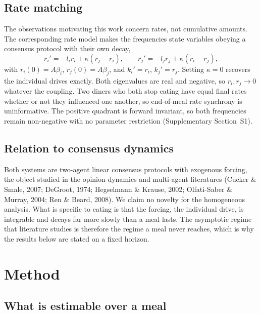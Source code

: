\documentclass[12pt]{article}
\newcommand{\ki}{k_i}
\newcommand{\kj}{k_j}
\begin{document}
\subsection*{Rate matching}

The observations motivating this work concern rates, not cumulative amounts. The
corresponding rate model makes the frequencies state variables obeying a
consensus protocol with their own decay,
\begin{equation}\label{eq:ratemodel}
r_i'=-l_ir_i+\kappa(r_j-r_i),
\qquad
r_j'=-l_jr_j+\kappa(r_i-r_j),
\end{equation}
with $r_i(0)=A\beta_i$, $r_j(0)=A\beta_j$, and $\ki'=r_i$, $\kj'=r_j$. Setting
$\kappa=0$ recovers the individual drives exactly. Both eigenvalues are real and
negative, so $r_i,r_j\to0$ whatever the coupling. Two diners who both stop eating
have equal final rates whether or not they influenced one another, so end-of-meal
rate synchrony is uninformative. The positive quadrant is forward invariant, so
both frequencies remain non-negative with no parameter restriction (Supplementary
Section~S1).

\subsection*{Relation to consensus dynamics}

Both systems are two-agent linear consensus protocols with exogenous forcing, the
object studied in the opinion-dynamics and multi-agent literatures (Cucker \&
Smale, 2007; DeGroot, 1974; Hegselmann \& Krause, 2002; Olfati-Saber \& Murray,
2004; Ren \& Beard, 2008). We claim no novelty for the homogeneous analysis. What
is specific to eating is that the forcing, the individual drive, is integrable and
decays far more slowly than a meal lasts. The asymptotic regime that literature
studies is therefore the regime a meal never reaches, which is why the results
below are stated on a fixed horizon.

\section*{Method}

\subsection*{What is estimable over a meal}
\end{document}
